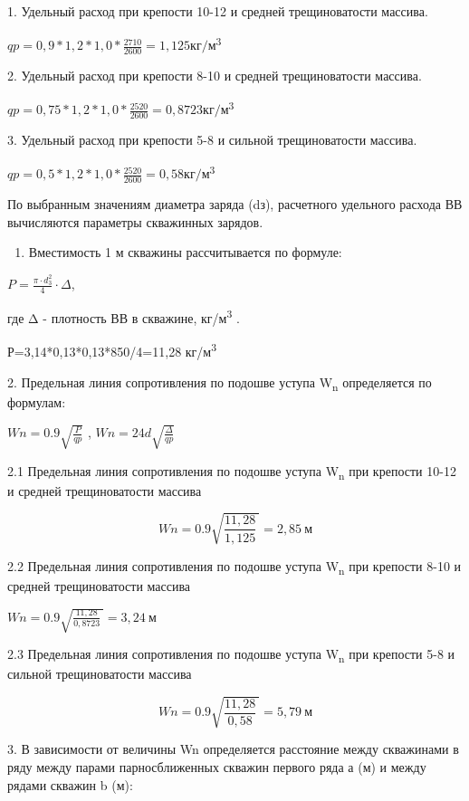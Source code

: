   \begin{multicols}{2}

1. Удельный расход при крепости 10-12 и средней трещиноватости массива.

\(qp = 0,9*1,2*1,0*\frac{2710}{2600} = 1,125кг/м\)\textsuperscript{3}

2. Удельный расход при крепости 8-10 и средней трещиноватости массива.

\(qp = 0,75*1,2*1,0*\frac{2520}{2600} = 0,8723кг/м\)\textsuperscript{3}

3. Удельный расход при крепости 5-8 и сильной трещиноватости массива.

\(qp = 0,5*1,2*1,0*\frac{2520}{2600} = 0,58кг/м\)\textsuperscript{3}

По выбранным значениям диаметра заряда (dз), расчетного удельного
расхода ВВ вычисляются параметры скважинных зарядов.

\begin{enumerate}
\def\labelenumi{\arabic{enumi}.}
\item
  Вместимость 1 м скважины рассчитывается по формуле:
\end{enumerate}

$P = \frac{\pi \cdot d_3^2}{4} \cdot \Delta$, 

где Δ - плотность ВВ в скважине, кг/м\textsuperscript{3} .

Р=3,14*0,13*0,13*850/4=11,28 кг/м\textsuperscript{3}

2. Предельная линия сопротивления по подошве уступа W\textsubscript{n}
определяется по формулам:

\(Wn = 0.9\sqrt{\frac{P}{qp}}\) , \(Wn = 24d\sqrt{\frac{\Delta}{qp}}\)

2.1 Предельная линия сопротивления по подошве уступа W\textsubscript{n}
при крепости 10-12 и средней трещиноватости массива

\[Wn = 0.9\sqrt{\frac{11,28}{1,125}\ } = 2,85\ м\]

2.2 Предельная линия сопротивления по подошве уступа W\textsubscript{n}
при крепости 8-10 и средней трещиноватости массива

\(Wn = 0.9\sqrt{\frac{11,28}{0,8723}\ } = 3,24\ м\)

2.3 Предельная линия сопротивления по подошве уступа W\textsubscript{n}
при крепости 5-8 и сильной трещиноватости массива

\[Wn = 0.9\sqrt{\frac{11,28}{0,58}\ } = 5,79\ м\]

3. В зависимости от величины Wn определяется расстояние между скважинами
в ряду между парами парносближенных скважин первого ряда а (м) и между
рядами скважин b (м):


\end{multicols}
